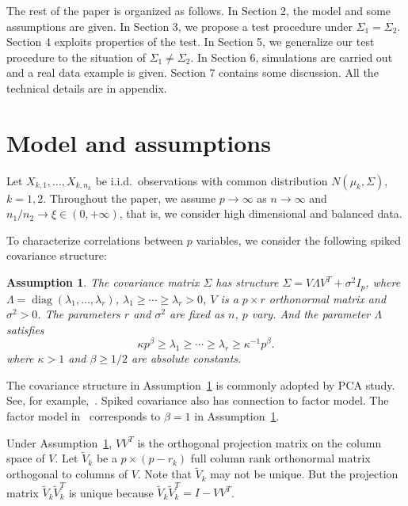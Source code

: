 \documentclass[review]{elsarticle}
\DeclareMathOperator{\mydiag}{diag}
\theoremstyle{plain}
\newtheorem{assumption}{\quad\quad Assumption}
\theoremstyle{definition}
\theoremstyle{remark}
\begin{document}
The rest of the paper is organized as follows. In Section 2,  the model and some assumptions are given.  In Section 3, we propose a test procedure under $\Sigma_1=\Sigma_2$. Section 4 exploits properties of the test. In Section 5, we generalize our test procedure to the situation of $\Sigma_1\neq \Sigma_2$. In Section 6, simulations are carried out and  a real data example is given. Section 7 contains some discussion. All the technical details are in appendix.

\section{Model and assumptions}
    Let $X_{k,1},\ldots, X_{k, n_k}$  be i.i.d.\ observations with common distribution $N(\mu_k,\Sigma)$, $k=1,2$.
    Throughout the paper, we  assume $p\to \infty$ as $n\to \infty$ and ${n_1}/{n_2}\to \xi \in (0,+\infty)$, that is, we consider high dimensional and balanced data.

To characterize correlations between $p$ variables, we consider the following spiked covariance structure:
\begin{assumption}\label{theModel}
    The covariance matrix $\Sigma$ has structure $ 
\Sigma=V\Lambda V^T+\sigma^2 I_p
$, where $\Lambda=\mydiag(\lambda_{1},\ldots,\lambda_{r})$, 
 $\lambda_{1}\geq \cdots \geq \lambda_{r}>0$,
$V$ is  a $p\times r$ orthonormal matrix and $\sigma^2>0$.
 The parameters $r$ and  $\sigma^2$ are fixed as $n$, $p$ vary.
   And the parameter $\Lambda$ satisfies     
    \begin{equation*}
        \kappa p^{\beta}\geq \lambda_{1}\geq \cdots \geq\lambda_{r}\geq \kappa^{-1}p^{\beta}.
\end{equation*}
where $\kappa>1$ and $\beta\geq {1}/{2}$ are absolute constants.
\end{assumption}

The covariance structure in Assumption~\ref{theModel} is commonly adopted by PCA study.
See, for example,~\cite{Cai2012Sparse}.
Spiked covariance also has connection to factor model.
The factor model in~\cite{Ma2015A} corresponds to $\beta=1$ in Assumption~\ref{theModel}.

Under Assumption~\ref{theModel}, $V V^T$ is the orthogonal projection matrix on the column space of $V$. Let $\tilde{V}_k$ be a $p\times (p-r_k)$ full column rank orthonormal matrix orthogonal to columns of  $V$.
 Note that $\tilde{V}_k$ may not be unique. But the projection matrix $\tilde{V}_k\tilde{V}_k^T$ is unique because $\tilde{V}_k\tilde{V}_k^T=I-V V^T$.
\end{document}
